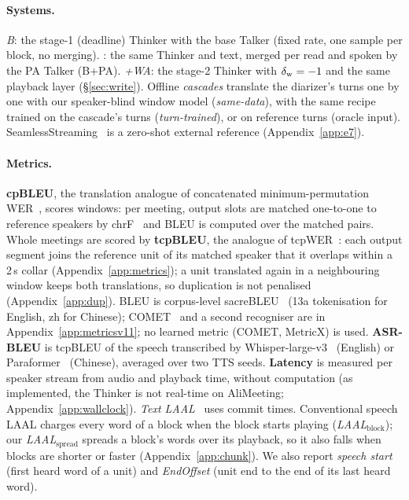\paragraph{Systems.} \emph{B}: the stage-1 (deadline) Thinker with the base Talker (fixed rate, one sample per
block, no merging). \emph{\sys{}}: the same Thinker and text, merged per read and spoken by the PA Talker (B+PA).
\emph{\sys{}+WA}: the stage-2 Thinker with $\delta_{\mathrm{w}}=-1$ and the same playback layer (\S\ref{sec:write}). Offline \emph{cascades} translate the diarizer's turns one by one with our
speaker-blind window model (\emph{same-data}), with the same recipe trained on the cascade's turns
(\emph{turn-trained}), or on reference turns (oracle input). SeamlessStreaming~\citep{seamless2023} is a zero-shot
external reference (Appendix~\ref{app:e7}).

\paragraph{Metrics.} \textbf{cpBLEU}, the translation analogue of concatenated minimum-permutation
WER~\citep{watanabe2020chime6}, scores windows: per meeting, output slots are matched one-to-one to reference speakers by
chrF~\citep{popovic2015chrf} and BLEU is computed over the matched pairs. Whole meetings are scored by \textbf{tcpBLEU},
the analogue of tcpWER~\citep{neumann2023meeteval}: each output segment joins the reference unit of its matched speaker
that it overlaps within a 2\,s collar (Appendix~\ref{app:metrics}); a unit translated again in a neighbouring window
keeps both translations, so duplication is not penalised (Appendix~\ref{app:dup}). BLEU is corpus-level
sacreBLEU~\citep{post2018call} (13a tokenisation for English, zh for Chinese)\ifMetricsV{}; COMET~\citep{rei2022comet} and a second recogniser are in Appendix~\ref{app:metricsv11}\else{}; no learned metric (COMET, MetricX) is used\fi.
\textbf{ASR-BLEU} is tcpBLEU of the speech transcribed by Whisper-large-v3~\citep{radford2023robust} (English) or
Paraformer~\citep{gao2022paraformer} (Chinese), averaged over two TTS seeds. \textbf{Latency} is measured per speaker
stream from audio and playback time, without computation\ifWallclock{} (as implemented, the Thinker is not
real-time on AliMeeting; Appendix~\ref{app:wallclock})\fi. \emph{Text LAAL}~\citep{papi2022over} uses commit times.
Conventional speech LAAL charges every word of a block when the block starts playing (\emph{LAAL$_\text{block}$}); our
\emph{LAAL$_\text{spread}$} spreads a block's words over its playback, so it also falls when blocks are shorter or
faster (Appendix~\ref{app:chunk}). We also report \emph{speech start} (first heard word of a unit) and \emph{EndOffset}
(unit end to the end of its last heard word).

